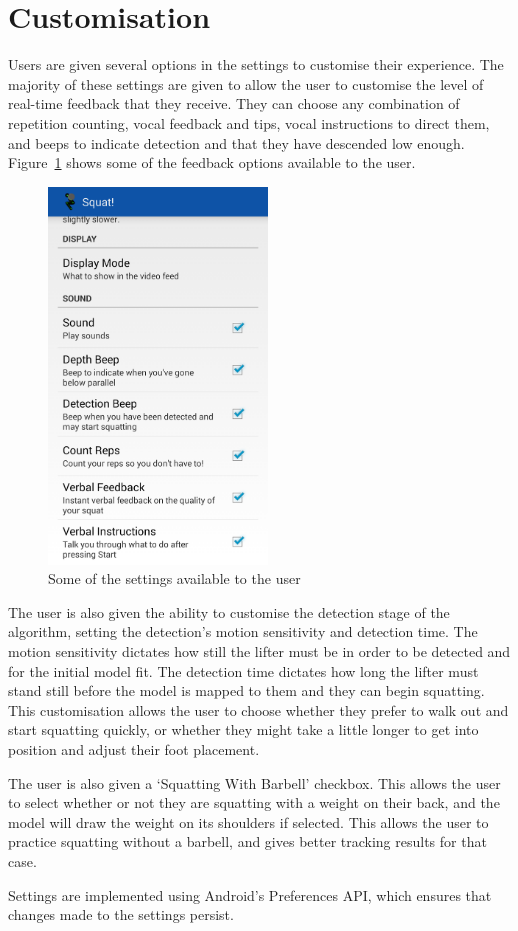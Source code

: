 \section{Customisation}

Users are given several options in the settings to customise their experience. The majority of these settings are given to allow the user to customise the level of real-time feedback that they receive. They can choose any combination of repetition counting, vocal feedback and tips, vocal instructions to direct them, and beeps to indicate detection and that they have descended low enough. Figure~\ref{fig:settings} shows some of the feedback options available to the user.

\begin{figure}[H]
    \centering
	\includegraphics[height=10cm]{application/images/settings}
\caption{Some of the settings available to the user}
\label{fig:settings}
\end{figure}

The user is also given the ability to customise the detection stage of the algorithm, setting the detection's motion sensitivity and detection time. The motion sensitivity dictates how still the lifter must be in order to be detected and for the initial model fit. The detection time dictates how long the lifter must stand still before the model is mapped to them and they can begin squatting. This customisation allows the user to choose whether they prefer to walk out and start squatting quickly, or whether they might take a little longer to get into position and adjust their foot placement.

The user is also given a `Squatting With Barbell' checkbox. This allows the user to select whether or not they are squatting with a weight on their back, and the model will draw the weight on its shoulders if selected. This allows the user to practice squatting without a barbell, and gives better tracking results for that case.

Settings are implemented using Android's Preferences API, which ensures that changes made to the settings persist.